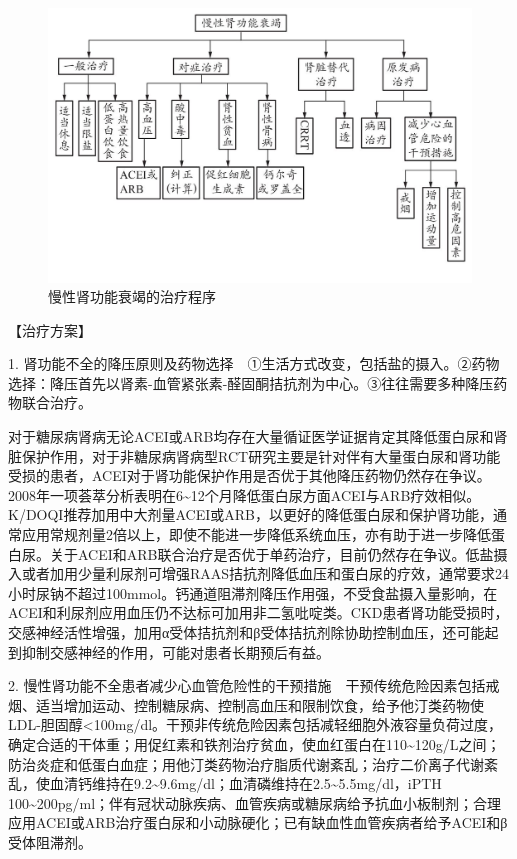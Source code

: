 \begin{figure}[!htbp]
 \centering
 \includegraphics{./images/Image00131.jpg}
 \captionsetup{justification=centering}
 \caption{慢性肾功能衰竭的治疗程序}
 \label{fig4-8-1}
  \end{figure} 

【治疗方案】

1.
肾功能不全的降压原则及药物选择　①生活方式改变，包括盐的摄入。②药物选择：降压首先以肾素-血管紧张素-醛固酮拮抗剂为中心。③往往需要多种降压药物联合治疗。

对于糖尿病肾病无论ACEI或ARB均存在大量循证医学证据肯定其降低蛋白尿和肾脏保护作用，对于非糖尿病肾病型RCT研究主要是针对伴有大量蛋白尿和肾功能受损的患者，ACEI对于肾功能保护作用是否优于其他降压药物仍然存在争议。2008年一项荟萃分析表明在6\textasciitilde{}12个月降低蛋白尿方面ACEI与ARB疗效相似。K/DOQI推荐加用中大剂量ACEI或ARB，以更好的降低蛋白尿和保护肾功能，通常应用常规剂量2倍以上，即使不能进一步降低系统血压，亦有助于进一步降低蛋白尿。关于ACEI和ARB联合治疗是否优于单药治疗，目前仍然存在争议。低盐摄入或者加用少量利尿剂可增强RAAS拮抗剂降低血压和蛋白尿的疗效，通常要求24小时尿钠不超过100mmol。钙通道阻滞剂降压作用强，不受食盐摄入量影响，在ACEI和利尿剂应用血压仍不达标可加用非二氢吡啶类。CKD患者肾功能受损时，交感神经活性增强，加用α受体拮抗剂和β受体拮抗剂除协助控制血压，还可能起到抑制交感神经的作用，可能对患者长期预后有益。

2.
慢性肾功能不全患者减少心血管危险性的干预措施　干预传统危险因素包括戒烟、适当增加运动、控制糖尿病、控制高血压和限制饮食，给予他汀类药物使LDL-胆固醇\textless{}100mg/dl。干预非传统危险因素包括减轻细胞外液容量负荷过度，确定合适的干体重；用促红素和铁剂治疗贫血，使血红蛋白在110\textasciitilde{}120g/L之间；防治炎症和低蛋白血症；用他汀类药物治疗脂质代谢紊乱；治疗二价离子代谢紊乱，使血清钙维持在9.2\textasciitilde{}9.6mg/dl；血清磷维持在2.5\textasciitilde{}5.5mg/dl，iPTH
100\textasciitilde{}200pg/ml；伴有冠状动脉疾病、血管疾病或糖尿病给予抗血小板制剂；合理应用ACEI或ARB治疗蛋白尿和小动脉硬化；已有缺血性血管疾病者给予ACEI和β受体阻滞剂。

